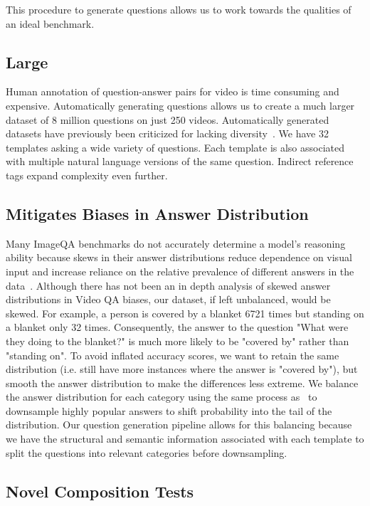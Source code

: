\documentclass[10pt,twocolumn,letterpaper]{article}
\begin{document}
This procedure to generate questions allows us to work towards the qualities of an ideal benchmark.
    
\subsection{Large}
    
    Human annotation of question-answer pairs for video is time consuming and expensive. Automatically generating questions allows us to create a much larger dataset of 8 million questions on just 250 videos. Automatically generated datasets have previously been criticized for lacking diversity~\cite{yu2019activitynet}. We have 32 templates asking a wide variety of questions. Each template is also associated with multiple natural language versions of the same question. Indirect reference tags expand complexity even further.

\subsection{Mitigates Biases in Answer Distribution}
    
    Many ImageQA benchmarks do not accurately determine a model's reasoning ability because skews in their answer distributions reduce dependence on visual input and increase reliance on the relative prevalence of different answers in the data~\cite{hudson2019gqa,goyal2017making}. Although there has not been an in depth analysis of skewed answer distributions in Video QA biases, our dataset, if left unbalanced, would be skewed. For example, a person is covered by a blanket 6721 times but standing on a blanket only 32 times. Consequently, the answer to the question "What were they doing to the blanket?" is much more likely to be "covered by" rather than "standing on". To avoid inflated accuracy scores, we want to retain the same distribution (i.e. still have more instances where the answer is "covered by"), but smooth the answer distribution to make the differences less extreme. We balance the answer distribution for each category using the same process as~\cite{hudson2019gqa} to downsample highly popular answers to shift probability into the tail of the distribution. Our question generation pipeline allows for this balancing because we have the structural and semantic information associated with each template to split the questions into relevant categories before downsampling. 


    
   \subsection{Novel Composition Tests}
    
\end{document}
